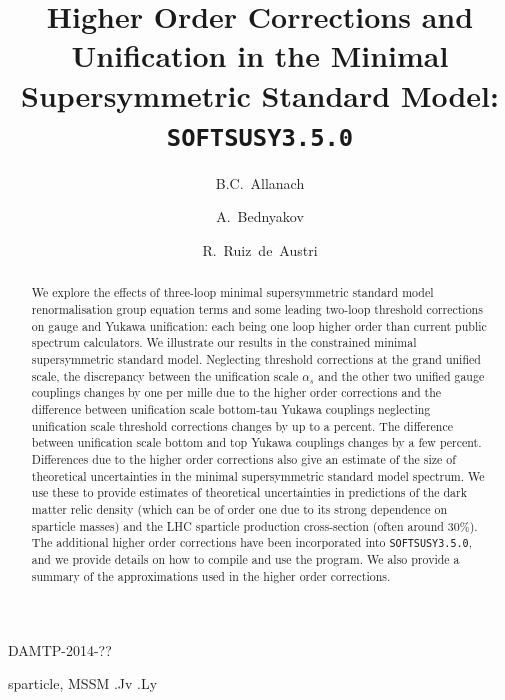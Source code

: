 \documentclass[final,3p,times,pdflatex]{elsarticle}
\begin{document}
\begin{frontmatter}

\begin{flushright}
DAMTP-2014-??
\end{flushright}

\title{Higher Order Corrections and Unification in
  the Minimal Supersymmetric Standard Model: {\tt SOFTSUSY3.5.0}}

\author[damtp]{B.C.~Allanach}
\author[dunba]{A.~Bednyakov}
\author[valencia]{R.~Ruiz~de~Austri}

\address[damtp]{DAMTP, CMS, University of Cambridge, Wilberforce road,
  Cambridge, CB3  0WA, United Kingdom}
\address[dubna]{Joint Institute for Nuclear Research, 141980, Dubna, Russia}
\address[valencia]{Instituto de Física Corpuscular, IFIC-UV/CSIC, E-46980
  Paterna, Spain}  

\begin{abstract}
  We explore the effects of three-loop minimal supersymmetric standard
  model   renormalisation group equation terms and some leading two-loop
  threshold corrections on gauge and Yukawa
  unification: each being one loop higher order than 
  current public spectrum calculators.
  We illustrate our results in the constrained minimal supersymmetric standard
  model. Neglecting threshold corrections at the grand unified scale, the
  discrepancy between the unification scale
  $\alpha_s$ and 
  the other two unified gauge couplings changes by one per mille due to the
  higher order 
  corrections and
  the difference between unification scale bottom-tau
  Yukawa couplings neglecting unification scale threshold
  corrections changes by up to a percent. The difference between unification
  scale bottom and top Yukawa couplings changes by a few percent.
  Differences due to the higher order corrections also give an estimate of the
  size of theoretical uncertainties in the minimal supersymmetric standard
  model spectrum. We use these to 
  provide   estimates 
  of theoretical uncertainties in predictions of the dark matter relic density
  (which can be of order one due to its strong dependence on sparticle masses)
  and the LHC sparticle production cross-section (often around 30$\%$).
  The additional higher order corrections have been
  incorporated into {\tt SOFTSUSY3.5.0}, and we provide details on how to
  compile and use the program. We also provide a summary of the
  approximations used in the higher order corrections. 
\end{abstract}

\begin{keyword}
sparticle, 
MSSM
.Jv
.Ly
\end{keyword}
\end{frontmatter}
\end{document}
